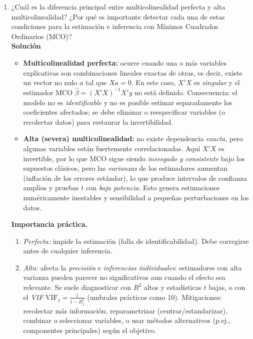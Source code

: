\documentclass[10pt,a4paper]{article}
\begin{document}
\begin{enumerate}

\item ¿Cuál es la diferencia principal entre multicolinealidad perfecta y alta multicolinealidad?
¿Por qué es importante detectar cada una de estas condiciones para la estimación e inferencia con Mínimos Cuadrados Ordinarios (MCO)?
\\
\textbf{Solución}
\begin{itemize}
    \item \textbf{Multicolinealidad perfecta:} ocurre cuando una o más variables explicativas son combinaciones lineales exactas de otras, es decir,
    existe un vector no nulo $a$ tal que $X a = 0$. En este caso, $X'X$ es \emph{singular} y el estimador MCO
    $\hat\beta = (X'X)^{-1} X'y$ no está definido. Consecuencia: el modelo no es \emph{identificable} y no es posible
    estimar separadamente los coeficientes afectados; se debe eliminar o reespecificar variables (o recolectar datos) para restaurar la invertibilidad.
    \item \textbf{Alta (severa) multicolinealidad:} no existe dependencia \emph{exacta}, pero algunas variables están fuertemente correlacionadas.
    Aquí $X'X$ es invertible, por lo que MCO sigue siendo \emph{insesgado y consistente} bajo los supuestos clásicos,
    pero las \emph{varianzas} de los estimadores aumentan (inflación de los errores estándar), lo que produce
    intervalos de confianza amplios y pruebas $t$ con \emph{baja potencia}. Esto genera estimaciones numéricamente inestables y sensibilidad a pequeñas perturbaciones en los datos.
\end{itemize}

\noindent
\textbf{Importancia práctica.}
\begin{enumerate}
    \item \emph{Perfecta:} impide la estimación (falla de identificabilidad). Debe corregirse antes de cualquier inferencia.
    \item \emph{Alta:} afecta la \emph{precisión} e \emph{inferencias individuales}: estimadores con alta varianza pueden parecer no significativos
    aun cuando el efecto sea relevante. Se suele diagnosticar con $R^2$ altos y estadísticas $t$ bajas, o con el \emph{VIF}
    $\mathrm{VIF}_j = \frac{1}{1 - R_j^2}$ (umbrales prácticos como 10).
    Mitigaciones: recolectar más información, reparametrizar (centrar/estandarizar), combinar o seleccionar variables,
    o usar métodos alternativos (p.ej., componentes principales) según el objetivo.
\end{enumerate}


\end{enumerate}
\end{document}
